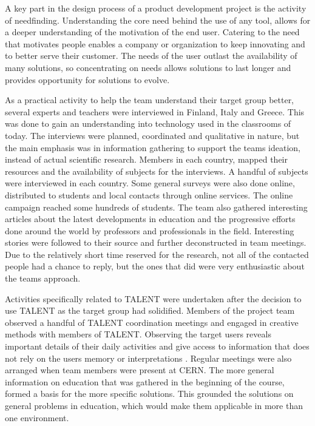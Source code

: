 \documentclass[english,12pt,a4paper,pdftex]{article}
\begin{document}
A key part in the design process of a product development project is the activity of needfinding. Understanding the core need behind the use of any tool, allows for a deeper understanding of the motivation of the end user. Catering to the need that motivates people enables a company or organization to keep innovating and to better serve their customer. The needs of the user outlast the availability of many solutions, so concentrating on needs allows solutions to last longer and provides opportunity for solutions to evolve. \cite{Patnaik} 

As a practical activity to help the team understand their target group better, several experts and teachers were interviewed in Finland, Italy and Greece. This was done to gain an understanding into technology used in the classrooms of today. The interviews were planned, coordinated and qualitative in nature, but the main emphasis was in information gathering to support the teams ideation, instead of actual scientific research. Members in each country, mapped their resources and the availability of subjects for the interviews. A handful of subjects were interviewed in each country. Some general surveys were also done online, distributed to students and local contacts through online services. The online campaign reached some hundreds of students. The team also gathered interesting articles about the latest developments in education and the progressive efforts done around the world by professors and professionals in the field. Interesting stories were followed to their source and further deconstructed in team meetings. Due to the relatively short time reserved for the research, not all of the contacted people had a chance to reply, but the ones that did were very enthusiastic about the teams approach. 

Activities specifically related to TALENT were undertaken after the decision to use TALENT as the target group had solidified. Members of the project team observed a handful of TALENT coordination meetings and engaged in creative methods with members of TALENT. Observing the target users reveals important details of their daily activities and give access to information that does not rely on the users memory or interpretations \cite{Patnaik}. Regular meetings were also arranged when team members were present at CERN. The more general information on education that was gathered in the beginning of the course, formed a basis for the more specific solutions. This grounded the solutions on general problems in education, which would make them applicable in more than one environment.
\end{document}
